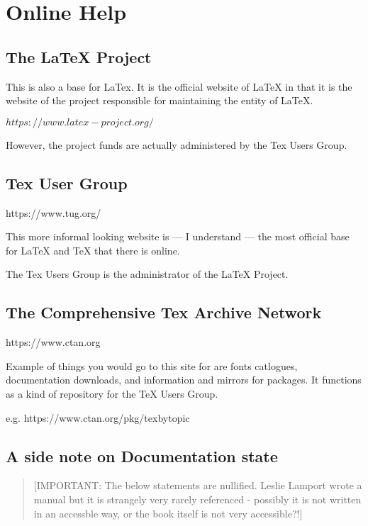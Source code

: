 \documentclass[12pt, oneside]{memoir}
\begin{document}
\section{Online Help}

\subsection{The LaTeX Project}

This is also a base for LaTex. It is the official website of LaTeX in that it is the website of the project responsible for maintaining the entity of LaTeX.

$https://www.latex-project.org/$

However, the project funds are actually administered by the Tex Users Group.

\subsection{Tex User Group}

https://www.tug.org/

This more informal looking website is — I understand — the most official base for LaTeX and TeX that there is online. 

The Tex Users Group is the administrator of the LaTeX Project.

\subsection{The Comprehensive Tex Archive Network}
\label{TUG}
https://www.ctan.org

Example of things you would go to this site for are fonts catlogues, documentation downloads, and information and mirrors for packages. It functions as a kind of repository for the TeX Users Group.

e.g.
https://www.ctan.org/pkg/texbytopic

\subsection{A side note on Documentation state}


\begin{quotation}
[IMPORTANT: The below statements are nullified. Leslie Lamport wrote a manual but it is strangely very rarely referenced - possibly it is not written in an accessble way, or the book itself is not very accessible?!]
\end{quotation}
\end{document}
